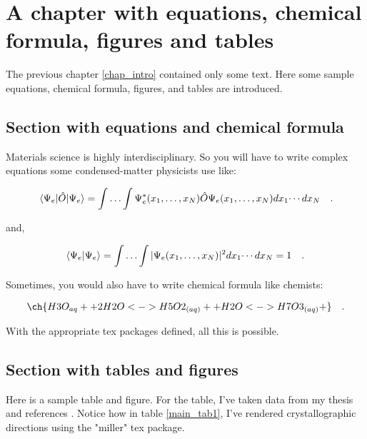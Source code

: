 \chapter{A chapter with equations, chemical formula, figures and tables}
\label{chap_main}

The previous chapter \ref{chap_intro} contained only some text. Here some sample
equations, chemical formula, figures, and tables
are introduced.

\section{Section with equations and chemical formula}
\label{sec_eq_fig_tab}

Materials science is highly interdisciplinary. So you will have to write complex
equations some condensed-matter physicists use like:

\begin{equation}
\expval{\hat{O}}{\Psi_e} = \int \dotsc \int \Psi_e^{*}(x_1,\dotsc,x_N) \hat{O}
\Psi_e(x_1,\dotsc ,x_N)  dx_1 \dotsi dx_N
\quad .
\label{main_eq1}
\end{equation}

and,

\begin{equation}
\braket{\Psi_e} = \int \dotsc \int |\Psi_e (x_1,\dotsc,x_N)|^2  dx_1\dotsi dx_N = 1
\quad .
\label{main_eq2}
\end{equation}

Sometimes, you would also have to write chemical formula like chemists:

\begin{equation}
\centering
\ch{H3O_{aq}+ + 2 H2O <-> H5O2_{(aq)}+ + H2O <-> H7O3_{(aq)}+} \quad .
\label{main_eq3}
\end{equation}

With the appropriate tex packages defined, all this is possible.

\section{Section with tables and figures}
\label{sec_tab_figs}

Here is a sample table and figure. For the table, I've taken data from my
thesis \cite{Surendralal2020} and references \cite{Singh-miller2009, Sakong2018, Kittel1976, Salmeron1983}.
Notice how in table \ref{main_tab1}, I've rendered crystallographic directions using
the "miller" tex package.

